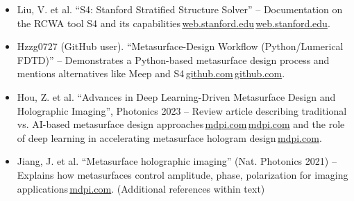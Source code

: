 \documentclass[11pt]{article}
\begin{document}
\begin{itemize}
  \item Liu, V. et al. ``S4: Stanford Stratified Structure Solver'' -- Documentation on the RCWA tool S4 and its capabilities\,\href{https://web.stanford.edu/group/fan/S4/#:~:text=S,the%20Stanford%20Electrical%20Engineering%20Department}{web.stanford.edu}\,\href{https://web.stanford.edu/group/fan/S4/#:~:text=What%20can%20it%20compute%3F%E2%80%B6}{web.stanford.edu}.
  \item Hzzg0727 (GitHub user). ``Metasurface-Design Workflow (Python/Lumerical FDTD)'' -- Demonstrates a Python-based metasurface design process and mentions alternatives like Meep and S4\,\href{https://github.com/hzzg0727/Metasurface-Design#:~:text=A%20major%20advantage%20of%20the,flexible%2C%20convenient%2C%20and%20automated%20workflow}{github.com}\,\href{https://github.com/hzzg0727/Metasurface-Design#:~:text=Here%20we%20use%20Lumerical%20FDTD,Meep%2C%20Lumerical%20RCWA%2C%20or%20S4}{github.com}.
  \item Hou, Z. et al. ``Advances in Deep Learning-Driven Metasurface Design and Holographic Imaging'', Photonics 2023 -- Review article describing traditional vs. AI-based metasurface design approaches\,\href{https://www.mdpi.com/2304-6732/12/10/947#:~:text=Traditional%20metasurface%20design%20methods%20mainly,simulate%20and%20analyze%20the%20electromagnetic}{mdpi.com}\,\href{https://www.mdpi.com/2304-6732/12/10/947#:~:text=Recently%2C%20the%20application%20of%20deep,429%2C353%20%2C%20431%2C355%20%2C%20433%2C357}{mdpi.com} and the role of deep learning in accelerating metasurface hologram design\,\href{https://www.mdpi.com/2304-6732/12/10/947#:~:text=match%20at%20L1259%20RNNs%2C%20and,previously%20complex%20inverse%20design%20process}{mdpi.com}.
  \item Jiang, J. et al. ``Metasurface holographic imaging'' (Nat. Photonics 2021) -- Explains how metasurfaces control amplitude, phase, polarization for imaging applications\,\href{https://www.mdpi.com/2304-6732/12/10/947#:~:text=holographic%20imaging%20enables%20rapid%20metasurface,focusing%2C%20beam%20shaping%2C%20and%20aberration}{mdpi.com}. (Additional references within text)
\end{itemize}
\end{document}
